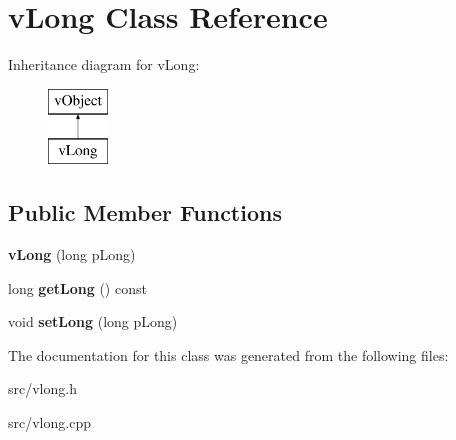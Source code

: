 \hypertarget{classv_long}{\section{v\-Long Class Reference}
\label{classv_long}
}
Inheritance diagram for v\-Long\-:\begin{figure}[H]
\begin{center}
\leavevmode
\includegraphics[height=2.000000cm]{classv_long}
\end{center}
\end{figure}
\subsection*{Public Member Functions}
\begin{DoxyCompactItemize}
\item 
\hypertarget{classv_long_a3f83a1aa7d4c2a7aa268ab0080f4d539}{{\bfseries v\-Long} (long p\-Long)}\label{classv_long_a3f83a1aa7d4c2a7aa268ab0080f4d539}

\item 
\hypertarget{classv_long_aac7423224f6b0f2053847146b2f4a751}{long {\bfseries get\-Long} () const }\label{classv_long_aac7423224f6b0f2053847146b2f4a751}

\item 
\hypertarget{classv_long_a9528ea53c73da5237e2afcf876644de7}{void {\bfseries set\-Long} (long p\-Long)}\label{classv_long_a9528ea53c73da5237e2afcf876644de7}

\end{DoxyCompactItemize}


The documentation for this class was generated from the following files\-:\begin{DoxyCompactItemize}
\item 
src/vlong.\-h\item 
src/vlong.\-cpp\end{DoxyCompactItemize}

